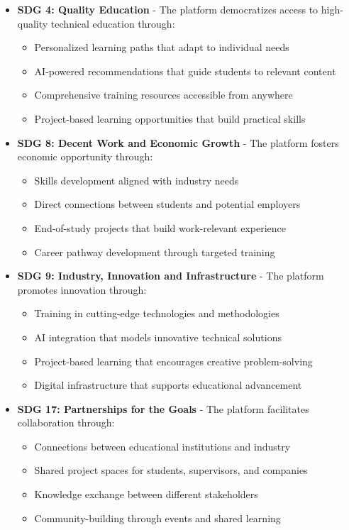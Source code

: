 \documentclass[12pt,a4paper]{report}
\begin{document}
\begin{itemize}
    \item \textbf{SDG 4: Quality Education} - The platform democratizes access to high-quality technical education through:
    \begin{itemize}
        \item Personalized learning paths that adapt to individual needs
        \item AI-powered recommendations that guide students to relevant content
        \item Comprehensive training resources accessible from anywhere
        \item Project-based learning opportunities that build practical skills
    \end{itemize}

    \item \textbf{SDG 8: Decent Work and Economic Growth} - The platform fosters economic opportunity through:
    \begin{itemize}
        \item Skills development aligned with industry needs
        \item Direct connections between students and potential employers
        \item End-of-study projects that build work-relevant experience
        \item Career pathway development through targeted training
    \end{itemize}

    \item \textbf{SDG 9: Industry, Innovation and Infrastructure} - The platform promotes innovation through:
    \begin{itemize}
        \item Training in cutting-edge technologies and methodologies
        \item AI integration that models innovative technical solutions
        \item Project-based learning that encourages creative problem-solving
        \item Digital infrastructure that supports educational advancement
    \end{itemize}

    \item \textbf{SDG 17: Partnerships for the Goals} - The platform facilitates collaboration through:
    \begin{itemize}
        \item Connections between educational institutions and industry
        \item Shared project spaces for students, supervisors, and companies
        \item Knowledge exchange between different stakeholders
        \item Community-building through events and shared learning
    \end{itemize}
\end{itemize}
\end{document}
